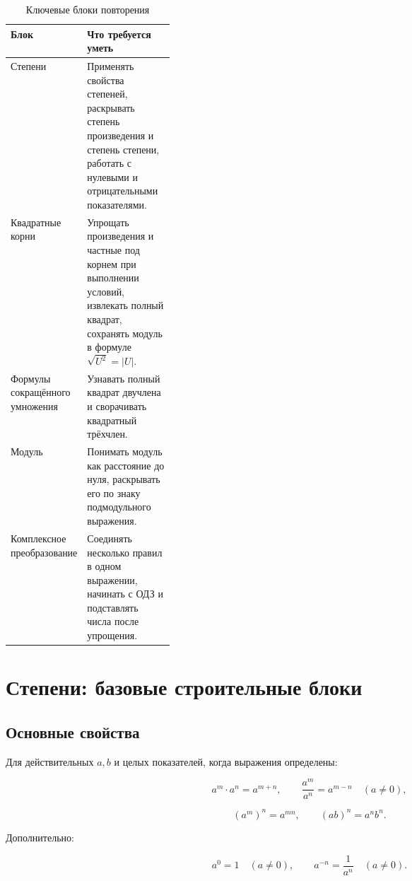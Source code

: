 \documentclass[a4paper,12pt]{article}
\begin{document}
\begin{table}[ht]
\centering
\caption{Ключевые блоки повторения}
\begin{tabularx}{\linewidth}{@{}p{0.27\linewidth}X@{}}
\toprule
\textbf{Блок} & \textbf{Что требуется уметь} \\
\midrule

Степени &
Применять свойства степеней, раскрывать степень произведения
и степень степени, работать с нулевыми и отрицательными показателями. \\

Квадратные корни &
Упрощать произведения и частные под корнем при выполнении условий,
извлекать полный квадрат, сохранять модуль
в формуле $\sqrt{U^2}=|U|$. \\

Формулы сокращённого умножения &
Узнавать полный квадрат двучлена и сворачивать квадратный трёхчлен. \\

Модуль &
Понимать модуль как расстояние до нуля,
раскрывать его по знаку подмодульного выражения. \\

Комплексное преобразование &
Соединять несколько правил в одном выражении,
начинать с ОДЗ и подставлять числа после упрощения. \\

\bottomrule
\end{tabularx}
\end{table}


\section{Степени: базовые строительные блоки}

\subsection{Основные свойства}

Для действительных $a,b$ и целых показателей,
когда выражения определены:

\[
a^m\cdot a^n=a^{m+n},
\qquad
\frac{a^m}{a^n}=a^{m-n}
\quad (a\ne0),
\]

\[
(a^m)^n=a^{mn},
\qquad
(ab)^n=a^n b^n.
\]

Дополнительно:

\[
a^0=1
\quad (a\ne0),
\qquad
a^{-n}=\frac{1}{a^n}
\quad (a\ne0).
\]
\end{document}
